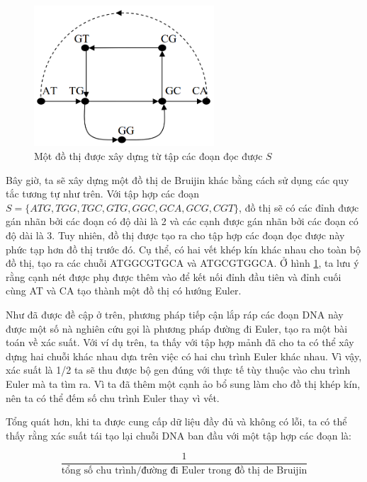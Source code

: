 \documentclass[14pt, a4paper]{article}
\numberwithin{equation}{section}
\numberwithin{figure}{section}
\numberwithin{dl}{section}
\numberwithin{md}{section}
\numberwithin{bd}{section}
\numberwithin{dn}{section}
\numberwithin{hq}{section}
\begin{document}
    \begin{figure}[h!]
        \centering
        \includegraphics[width=0.6\textwidth]{3.png}
        \caption{Một đồ thị được xây dựng từ tập các đoạn đọc được $S$}
        \label{fig:3}
    \end{figure}

    Bây giờ, ta sẽ xây dựng một đồ thị de Bruijin khác bằng cách sử dụng các quy tắc tương tự như trên.
    Với tập hợp các đoạn $S = \lbrace ATG, TGG, TGC, GTG, GGC, GCA, GCG, CGT \rbrace$,
    đồ thị sẽ có các đỉnh được gán nhãn bởi các đoạn có độ dài là 2 và các cạnh được gán nhãn bởi các đoạn có độ dài là 3.
    Tuy nhiên, đồ thị được tạo ra cho tập hợp các đoạn đọc được này phức tạp hơn đồ thị trước đó.
    Cụ thể, có hai vết khép kín khác nhau cho toàn bộ đồ thị, tạo ra các chuỗi ATGGCGTGCA và ATGCGTGGCA.
    Ở hình \ref{fig:3}, ta lưu ý rằng cạnh nét được phụ được thêm vào để kết nối đỉnh đầu tiên và đỉnh cuối cùng AT và CA tạo thành một đồ thị có hướng Euler.

    Như đã được đề cập ở trên, phương pháp tiếp cận lắp ráp các đoạn DNA này được một số nà nghiên cứu gọi là phương pháp đường đi Euler, tạo ra một bài toán về xác suất.
    Với ví dụ trên, ta thấy với tập hợp mảnh đã cho ta có thể xây dựng hai chuỗi khác nhau dựa trên việc có hai chu trình Euler khác nhau.
    Vì vậy, xác suất là 1/2 ta sẽ thu được bộ gen đúng với thực tế tùy thuộc vào chu trình Euler mà ta tìm ra.
    Vì ta đã thêm một cạnh ảo bổ sung làm cho đồ thị khép kín, nên ta có thể đếm số chu trình Euler thay vì vết.

    Tổng quát hơn, khi ta được cung cấp dữ liệu đầy đủ và không có lỗi, ta có thể thấy rằng xác suất tái tạo lại chuỗi DNA ban đầu với một tập hợp các đoạn là:

    \begin{equation}
        \dfrac{1}{\text{tổng số chu trình/đường đi Euler trong đồ thị de Bruijin}}
    \end{equation}
\end{document}

